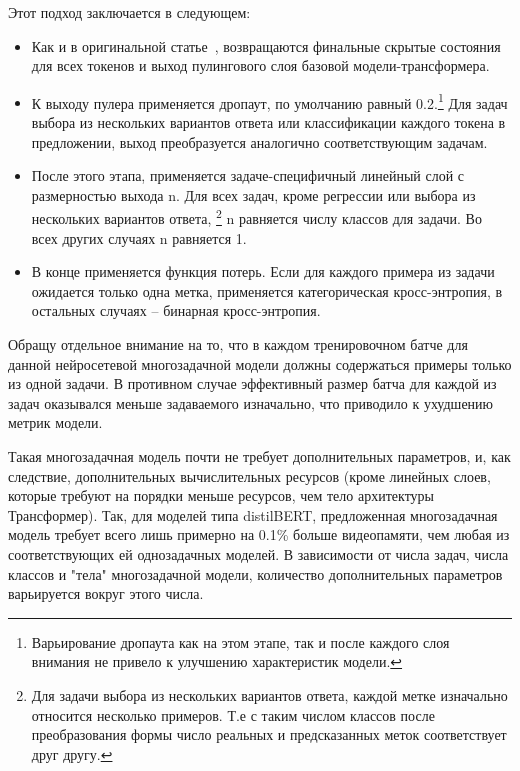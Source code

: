 Этот подход заключается в следующем:
\begin{itemize}

  \item Как и в оригинальной статье~\cite{bert}, возвращаются финальные скрытые состояния для всех токенов и выход пулингового слоя базовой модели-трансформера. 
  
  \item К выходу пулера применяется дропаут, по умолчанию равный 0.2.\footnote{Варьирование дропаута как на этом этапе, так и после каждого слоя внимания не привело к улучшению характеристик модели.} Для задач выбора из нескольких вариантов ответа или классификации каждого токена в предложении, выход преобразуется аналогично соответствующим задачам.

  \item После этого этапа, применяется задаче-специфичный линейный слой с размерностью выхода {n}. Для всех задач, кроме регрессии или выбора из нескольких вариантов ответа, \footnote{Для задачи выбора из нескольких вариантов ответа, каждой метке изначально относится несколько примеров. Т.е с таким числом классов после преобразования формы число реальных и предсказанных меток соответствует друг другу.} {n} равняется числу классов для задачи. Во всех других случаях {n} равняется 1.
 
  \item В конце применяется функция потерь. Если для каждого примера из задачи ожидается только одна метка, применяется категорическая кросс-энтропия, в остальных случаях -- бинарная кросс-энтропия. 

\end{itemize}

Обращу отдельное внимание на то, что в каждом тренировочном батче для данной нейросетевой многозадачной модели должны содержаться примеры только из одной задачи. В противном случае эффективный размер батча для каждой из задач оказывался меньше задаваемого изначально, что приводило к ухудшению метрик модели. 

Такая многозадачная модель почти не требует дополнительных параметров, и, как следствие, дополнительных вычислительных ресурсов (кроме линейных слоев, которые требуют на порядки меньше ресурсов, чем тело архитектуры Трансформер). Так, для моделей типа distilBERT, предложенная многозадачная модель требует всего лишь примерно на  0.1\% больше видеопамяти, чем любая из соответствующих ей однозадачных моделей. В зависимости от числа задач, числа классов и "тела" многозадачной модели, количество дополнительных параметров варьируется вокруг этого числа. 

